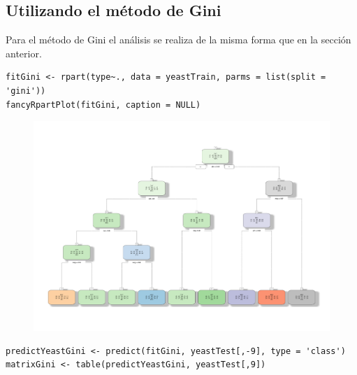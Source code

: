 \documentclass[11pt]{article}
\begin{document}
\subsection*{Utilizando el método de Gini}

Para el método de Gini el análisis se realiza de la misma forma que en la sección anterior.

\begin{verbatim}
fitGini <- rpart(type~., data = yeastTrain, parms = list(split = 'gini'))
fancyRpartPlot(fitGini, caption = NULL)
\end{verbatim}

\begin{figure}[h!]
  \begin{center}
    \includegraphics[width=1\linewidth]{treeGini.pdf}
  \end{center}
\end{figure}

\begin{verbatim}
predictYeastGini <- predict(fitGini, yeastTest[,-9], type = 'class')
matrixGini <- table(predictYeastGini, yeastTest[,9])  
\end{verbatim}
\end{document}
